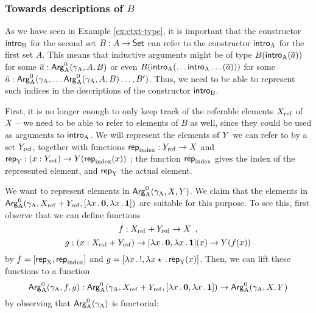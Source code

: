 \documentclass{schwicht}
\begin{document}
\subsubsection{Towards descriptions of $B$} %
\label{sec:towards-SPB}

As we have seen in Example \ref{ex:ctxt-type}, it is important that
the constructor $\mathsf{intro}_{\mathrm{B}}$ for the second set $B : A \to \mathsf{Set}$ can
refer to the constructor $\mathsf{intro}_{\mathrm{A}}$ for the first set $A$. This means
that inductive arguments might be of type $B(\mathsf{intro}_{\mathrm{A}}(\overline{a}))$
for some $\overline{a} : \mathsf{Arg}^{0}_{\mathrm{A}}(\gamma_{\mathrm{A}}, A, B)$ or even
$B(\mathsf{intro}_{\mathrm{A}}(\ldots\mathsf{intro}_{\mathrm{A}}\ldots(\overline{a})))$ for some $\overline{a}
: \mathsf{Arg}^{0}_{\mathrm{A}}(\gamma_{\mathrm{A}}, \ldots \mathsf{Arg}^{0}_{\mathrm{A}}(\gamma_{\mathrm{A}}, A, B)\ldots, B')$. Thus, we
need to be able to represent such indices in the descriptions of the
constructor $\mathsf{intro}_{\mathrm{B}}$.

First, it is no longer enough to only keep track of the referable
elements $X_{\mathrm{ref}}$ of $X$ -- we need to be able to refer to elements of
$B$ as well, since they could be used as arguments to $\mathsf{intro}_{\mathrm{A}}$. We
will represent the elements of $Y$ we can refer to by a set $Y_{\mathrm{ref}}$,
together with functions $\mathsf{rep}_{\mathrm{index}} : Y_{\mathrm{ref}} \to X$ and $\mathsf{rep}_{\mathrm{Y}} : (x :
Y_{\mathrm{ref}}) \to Y(\mathsf{rep}_{\mathrm{index}}(x))$ ; the function $\mathsf{rep}_{\mathrm{index}}$ gives the index
of the represented element, and $\mathsf{rep}_{\mathrm{Y}}$ the actual element.

We want to represent elements in $\mathsf{Arg}^{0}_{\mathrm{A}}(\gamma_{\mathrm{A}}, X, Y)$. We claim that
the elements in $\mathsf{Arg}^{0}_{\mathrm{A}}(\gamma_{\mathrm{A}}, X_{\mathrm{ref}} + Y_{\mathrm{ref}}, [\lambda x\,.\,\mathbf{0},
\lambda x\,.\,\mathbf{1}])$ are suitable for this purpose. To see this,
first observe that we can define functions
\[
f : X_{\mathrm{ref}} + Y_{\mathrm{ref}} \to X \enspace ,
\]
%
%
\[
g : (x : X_{\mathrm{ref}} + Y_{\mathrm{ref}}) \to
    [\lambda x\,.\,\mathbf{0}, \lambda x\,.\,\mathbf{1}](x)
      \to Y(f(x))
\]
%
by $f = [\mathsf{rep}_{\mathrm{X}}, \mathsf{rep}_{\mathrm{index}}]$ and $g = [\lambda x\,.\,!, \lambda x \star\,.\, \mathsf{rep}_{\mathrm{Y}}(x)]$. Then, we can lift these
functions to a function
%
\[
\mathsf{Arg}^{0}_{\mathrm{A}}(\gamma_{\mathrm{A}}, f, g) : \mathsf{Arg}^{0}_{\mathrm{A}}(\gamma_{\mathrm{A}}, X_{\mathrm{ref}} +Y_{\mathrm{ref}}, [\lambda x\,.\,\mathbf{0}, \lambda x\,.\,\mathbf{1}]) \to
                       \mathsf{Arg}^{0}_{\mathrm{A}}(\gamma_{\mathrm{A}}, X, Y)
\]
%
by observing that $\mathsf{Arg}^{0}_{\mathrm{A}}(\gamma_{\mathrm{A}})$ is functorial:
\end{document}
